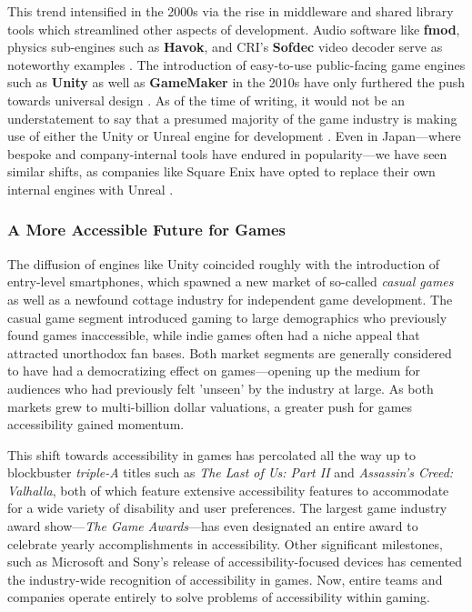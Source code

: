 \documentclass{report}
\newcommand{\tech}[1]{\textbf{#1}}
\begin{document}
This trend intensified in the 2000s via the rise in middleware and shared library tools which streamlined other aspects of development. Audio software like \tech{fmod}, physics sub-engines such as \tech{Havok}, and CRI's \tech{Sofdec} video decoder serve as noteworthy examples \cite{Foley_2015}. The introduction of easy-to-use public-facing game engines such as \tech{Unity} as well as \tech{GameMaker} in the 2010s have only furthered the push towards universal design \cite{Cobbett_2017}. As of the time of writing, it would not be an understatement to say that a presumed majority of the game industry is making use of either the Unity or Unreal engine for development \cite{CBResearch_2018}. Even in Japan---where bespoke and company-internal tools have endured in popularity---we have seen similar shifts, as companies like Square Enix have opted to replace their own internal engines with Unreal \cite{Sinclair_2012}.

\subsubsection{A More Accessible Future for Games}
The diffusion of engines like Unity coincided roughly with the introduction of entry-level smartphones, which spawned a new market of so-called \emph{casual games} as well as a newfound cottage industry for independent game development. The casual game segment introduced gaming to large demographics who previously found games inaccessible, while indie games often had a niche appeal that attracted unorthodox fan bases. Both market segments are generally considered to have had a democratizing effect on games---opening up the medium for audiences who had previously felt 'unseen' by the industry at large. As both markets grew to multi-billion dollar valuations, a greater push for games accessibility gained momentum. 

This shift towards accessibility in games has percolated all the way up to blockbuster \emph{triple-A} titles such as \emph{The Last of Us: Part II} and \emph{Assassin's Creed: Valhalla}, both of which feature extensive accessibility features to accommodate for a wide variety of disability and user preferences. The largest game industry award show---\emph{The Game Awards}---has even designated an entire award to celebrate yearly accomplishments in accessibility. Other significant milestones, such as Microsoft and Sony's release of accessibility-focused devices has cemented the industry-wide recognition of accessibility in games. Now, entire teams and companies operate entirely to solve problems of accessibility within gaming.  
\end{document}
